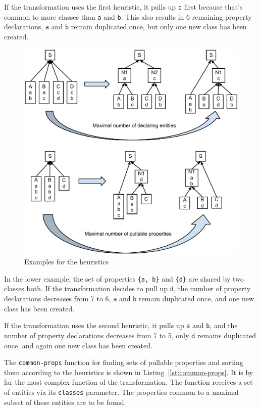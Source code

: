 \documentclass[submission]{eptcs}
\begin{document}
If the transformation uses the first heuristic, it pulls up \verb|c| first
because that's common to more classes than \verb|a| and \verb|b|.  This also
results in 6 remaining property declarations, \verb|a| and \verb|b| remain
duplicated once, but only one new class has been created.

\begin{figure}[t]
  \centering
  \includegraphics[width=0.6\linewidth]{heuristics-example}
  \caption{Examples for the heuristics}
  \label{fig:heuristics-example}
\end{figure}

In the lower example, the set of properties \verb|{a, b}| and \verb|{d}| are
shared by two classes both.  If the transformation decides to pull up \verb|d|,
the number of property declarations decreases from 7 to 6, \verb|a| and
\verb|b| remain duplicated once, and one new class has been created.

If the transformation uses the second heuristic, it pulls up \verb|a| and
\verb|b|, and the number of property declarations decreases from 7 to 5, only
\verb|d| remains duplicated once, and again one new class has been created.

The \verb|common-props| function for finding sets of pullable properties and
sorting them according to the heuristics is shown in
Listing~\ref{lst:common-props}.  It is by far the most complex function of the
transformation.  The function receives a set of entities via its \verb|classes|
parameter.  The properties common to a maximal subset of these entities are to
be found.
\end{document}
